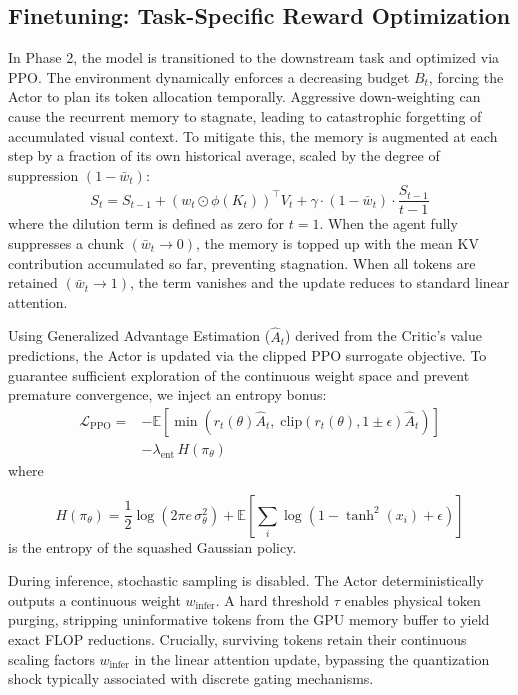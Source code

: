\subsection{Finetuning: Task-Specific Reward Optimization}
In Phase 2, the model is transitioned to the downstream task and optimized via PPO. The environment dynamically enforces a decreasing budget $B_t$, forcing the Actor to plan its token allocation temporally. 
Aggressive down-weighting can cause the recurrent memory to stagnate, leading to 
catastrophic forgetting of accumulated visual context. To mitigate this, the memory is augmented at each step by a fraction of its own historical average, scaled by the degree of suppression $(1 - \bar{w}_t)$:
\begin{equation}
    S_t = S_{t-1} + \left(w_t \odot \phi(K_t)\right)^\top V_t 
    + \gamma \cdot (1 - \bar{w}_t) \cdot \frac{S_{t-1}}{t-1}
\end{equation}
where the dilution term is defined as zero for $t=1$. When the agent fully suppresses 
a chunk $({\bar{w}_t \to 0})$, the memory is topped up with the mean KV contribution 
accumulated so far, preventing stagnation. When all tokens are retained 
$(\bar{w}_t \to 1)$, the term vanishes and the update reduces to standard linear 
attention.

Using Generalized Advantage Estimation ($\hat{A}_t$) derived from the Critic's value predictions, the Actor is updated via the clipped PPO surrogate objective. To guarantee sufficient exploration of the continuous weight space and prevent premature convergence, we inject an entropy bonus:
\begin{equation}
\begin{split}
\mathcal{L}_{\mathrm{PPO}} = &-\mathbb{E}\!\left[\min\!\left(r_t(\theta)\hat{A}_t,\;
    \mathrm{clip}(r_t(\theta),1\pm\epsilon)\hat{A}_t\right)\right] \\
&- \lambda_{\mathrm{ent}}\, H(\pi_\theta)
\end{split}
\end{equation}
where

\begin{equation}
H(\pi_\theta) = \frac{1}{2}\log(2\pi e\,\sigma_\theta^2) 
+ \mathbb{E}\!\left[\sum_i \log(1 - \tanh^2(x_i) + \epsilon)\right]
\end{equation}
is the entropy of the squashed Gaussian policy.

During inference, stochastic sampling is disabled. The Actor deterministically outputs a continuous weight $w_{\text{infer}}$. A hard threshold $\tau$ enables physical token purging, stripping uninformative tokens from the GPU memory buffer to yield exact FLOP reductions. Crucially, surviving tokens retain their continuous scaling factors $w_{\text{infer}}$ in the linear attention update, bypassing the quantization shock typically associated with discrete gating mechanisms.
